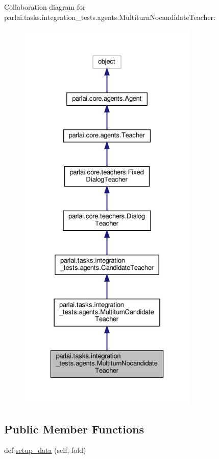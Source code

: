 Collaboration diagram for parlai.\+tasks.\+integration\+\_\+tests.\+agents.\+Multiturn\+Nocandidate\+Teacher\+:
\nopagebreak
\begin{figure}[H]
\begin{center}
\leavevmode
\includegraphics[height=550pt]{classparlai_1_1tasks_1_1integration__tests_1_1agents_1_1MultiturnNocandidateTeacher__coll__graph}
\end{center}
\end{figure}
\subsection*{Public Member Functions}
\begin{DoxyCompactItemize}
\item 
def \hyperlink{classparlai_1_1tasks_1_1integration__tests_1_1agents_1_1MultiturnNocandidateTeacher_ac786d0ae36e1d445d68a076b8d1b8391}{setup\+\_\+data} (self, fold)
\end{DoxyCompactItemize}
